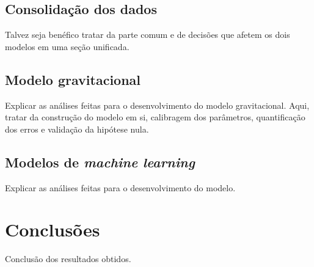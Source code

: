 \documentclass[12pt]{article}
\begin{document}
\hypertarget{consolidauxe7uxe3o-dos-dados}{%
\subsection{Consolidação dos dados}\label{consolidauxe7uxe3o-dos-dados}}

Talvez seja benéfico tratar da parte comum e de decisões que afetem os
dois modelos em uma seção unificada.

\hypertarget{modelo-gravitacional-1}{%
\subsection{Modelo gravitacional}\label{modelo-gravitacional-1}}

Explicar as análises feitas para o desenvolvimento do modelo
gravitacional. Aqui, tratar da construção do modelo em si, calibragem
dos parâmetros, quantificação dos erros e validação da hipótese nula.

\hypertarget{modelos-de-machine-learning-1}{%
\subsection{\texorpdfstring{Modelos de \emph{machine
learning}}{Modelos de machine learning}}\label{modelos-de-machine-learning-1}}

Explicar as análises feitas para o desenvolvimento do modelo.

\hypertarget{conclusuxf5es}{%
\section{Conclusões}\label{conclusuxf5es}}

Conclusão dos resultados obtidos.



\end{document}
